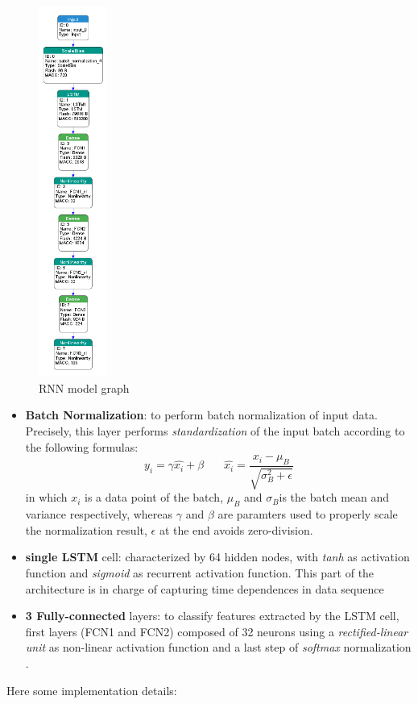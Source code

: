 \begin{figure}
	\hfill\includegraphics[width=0.2\textwidth]{figures/rnn.png}\hspace*{\fill}
	\caption{RNN model graph}\label{fig:15}
	\centering
	\vspace{-250pt}
\end{figure}
\noindent
\begin{itemize}
	\item \textbf{Batch Normalization}: to perform batch normalization of input data. Precisely, this layer performs \textit{standardization} of the input batch according to the following formulas:
	\[
		 y_{i} = \gamma \hat{x_{i}} + \beta \ \ \ \ \ \ \ \ 
		 \hat{x_{i}} = \frac{x_{i} - \mu_{B}}{\sqrt{\sigma_{B}^2 + \epsilon}}
	\]
	in which $x_{i}$ is a data point of the batch, $ \mu_{B} $ and $ \sigma_{B} $is the batch mean and variance respectively, whereas $ \gamma $ and $ \beta $ are paramters used to properly scale the normalization result, $ \epsilon $ at the end avoids zero-division. 
	\item \textbf{single LSTM} cell: characterized by 64 hidden nodes, with \textit{tanh} as activation function and \textit{sigmoid} as recurrent activation function. This part of the architecture is in charge of capturing time dependences in data sequence  
	\item \textbf{3 Fully-connected} layers: to classify features extracted by the LSTM cell, first layers (FCN1 and FCN2) composed of 32 neurons using a \textit{rectified-linear unit} as non-linear activation function and a last step of \textit{softmax} normalization . 
\end{itemize}
Here some implementation details:



